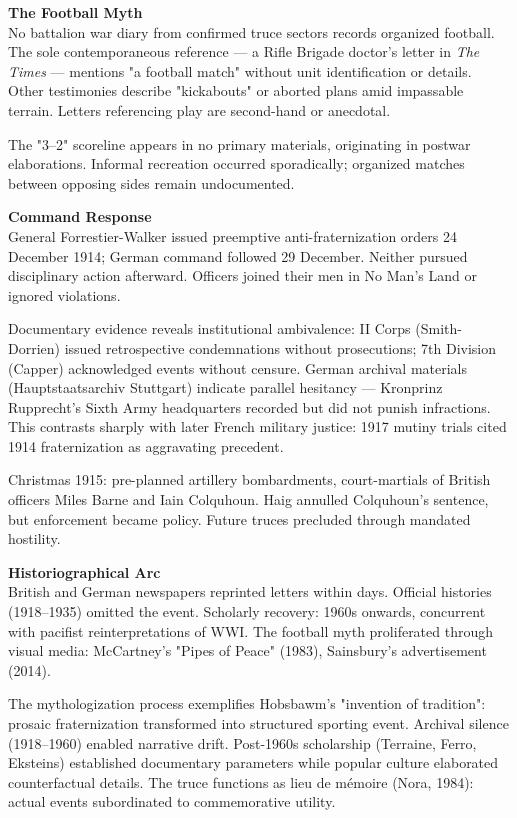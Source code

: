 \begin{technical}
\noindent\textbf{The Football Myth}\\[0.5em]
No battalion war diary from confirmed truce sectors records organized football. The sole contemporaneous reference — a Rifle Brigade doctor's letter in \textit{The Times} — mentions "a football match" without unit identification or details. Other testimonies describe "kickabouts" or aborted plans amid impassable terrain. Letters referencing play are second-hand or anecdotal.

The "3–2" scoreline appears in no primary materials, originating in postwar elaborations. Informal recreation occurred sporadically; organized matches between opposing sides remain undocumented.

\noindent\textbf{Command Response}\\[0.5em]
General Forrestier-Walker issued preemptive anti-fraternization orders 24 December 1914; German command followed 29 December. Neither pursued disciplinary action afterward. Officers joined their men in No Man's Land or ignored violations.

Documentary evidence reveals institutional ambivalence: II Corps (Smith-Dorrien) issued retrospective condemnations without prosecutions; 7th Division (Capper) acknowledged events without censure. German archival materials (Hauptstaatsarchiv Stuttgart) indicate parallel hesitancy — Kronprinz Rupprecht's Sixth Army headquarters recorded but did not punish infractions. This contrasts sharply with later French military justice: 1917 mutiny trials cited 1914 fraternization as aggravating precedent.

Christmas 1915: pre-planned artillery bombardments, court-martials of British officers Miles Barne and Iain Colquhoun. Haig annulled Colquhoun's sentence, but enforcement became policy. Future truces precluded through mandated hostility.

\noindent\textbf{Historiographical Arc}\\[0.5em]
British and German newspapers reprinted letters within days. Official histories (1918–1935) omitted the event. Scholarly recovery: 1960s onwards, concurrent with pacifist reinterpretations of WWI. The football myth proliferated through visual media: McCartney's "Pipes of Peace" (1983), Sainsbury's advertisement (2014).

The mythologization process exemplifies Hobsbawm's "invention of tradition": prosaic fraternization transformed into structured sporting event. Archival silence (1918–1960) enabled narrative drift. Post-1960s scholarship (Terraine, Ferro, Eksteins) established documentary parameters while popular culture elaborated counterfactual details. The truce functions as lieu de mémoire (Nora, 1984): actual events subordinated to commemorative utility.


\end{technical}
